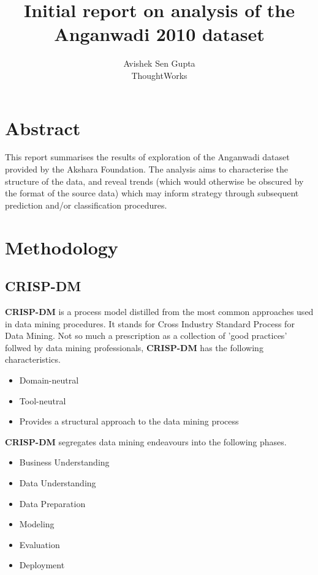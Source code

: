 \documentclass[10pt]{article}
\begin{document}
\title{Initial report on analysis of the Anganwadi 2010 dataset} 
\author{Avishek Sen Gupta\\ThoughtWorks}
\maketitle
\newpage
\tableofcontents
\listoffigures
\newpage

\section{Abstract}
This report summarises the results of exploration of the Anganwadi dataset provided by the Akshara Foundation. The analysis aims to characterise the structure of the data, and reveal trends (which would otherwise be obscured by the format of the source data) which may inform strategy through subsequent prediction and/or classification procedures.

\newpage
\section{Methodology}
\subsection{CRISP-DM}
\textbf{CRISP-DM} is a process model distilled from the most common approaches used in data mining procedures. It stands for Cross Industry Standard Process for Data Mining. Not so much a prescription as a collection of 'good practices' follwed by data mining professionals, \textbf{CRISP-DM} has the following characteristics.

\begin{itemize}
\item Domain-neutral
\item Tool-neutral
\item Provides a structural approach to the data mining process
\end{itemize}

\textbf{CRISP-DM} segregates data mining endeavours into the following phases.

\begin{itemize}
\item Business Understanding
\item Data Understanding
\item Data Preparation
\item Modeling
\item Evaluation
\item Deployment
\end{itemize}
\end{document}
